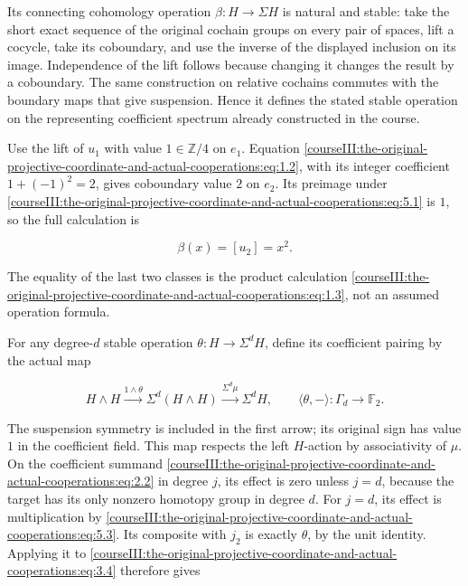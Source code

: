 Its connecting cohomology operation \(\beta:H\to\Sigma H\) is natural and stable: take the short exact sequence of the original cochain groups on every pair of spaces, lift a cocycle, take its coboundary, and use the inverse of the displayed inclusion on its image. Independence of the lift follows because changing it changes the result by a coboundary. The same construction on relative cochains commutes with the boundary maps that give suspension. Hence it defines the stated stable operation on the representing coefficient spectrum already constructed in the course.

Use the lift of \(u_1\) with value \(1\in\mathbb Z/4\) on \(e_1\). Equation \eqref{courseIII:the-original-projective-coordinate-and-actual-cooperations:eq:1.2}, with its integer coefficient \(1+(-1)^2=2\), gives coboundary value \(2\) on \(e_2\). Its preimage under \eqref{courseIII:the-original-projective-coordinate-and-actual-cooperations:eq:5.1} is \(1\), so the full calculation is

\begin{equation}
\beta(x)=[u_2]=x^2.
 \label{courseIII:the-original-projective-coordinate-and-actual-cooperations:eq:5.2}
\end{equation}

The equality of the last two classes is the product calculation \eqref{courseIII:the-original-projective-coordinate-and-actual-cooperations:eq:1.3}, not an assumed operation formula.

For any degree-\(d\) stable operation \(\theta:H\to\Sigma^dH\), define its coefficient pairing by the actual map

\begin{equation}
H\wedge H\xrightarrow{1\wedge\theta}\Sigma^d(H\wedge H)
        \xrightarrow{\Sigma^d\mu}\Sigma^dH,
 \qquad
 \langle\theta,-\rangle:\Gamma_d\longrightarrow\mathbb F_2.
 \label{courseIII:the-original-projective-coordinate-and-actual-cooperations:eq:5.3}
\end{equation}

The suspension symmetry is included in the first arrow; its original sign has value \(1\) in the coefficient field. This map respects the left \(H\)-action by associativity of \(\mu\). On the coefficient summand \eqref{courseIII:the-original-projective-coordinate-and-actual-cooperations:eq:2.2} in degree \(j\), its effect is zero unless \(j=d\), because the target has its only nonzero homotopy group in degree \(d\). For \(j=d\), its effect is multiplication by \eqref{courseIII:the-original-projective-coordinate-and-actual-cooperations:eq:5.3}. Its composite with \(j_2\) is exactly \(\theta\), by the unit identity. Applying it to \eqref{courseIII:the-original-projective-coordinate-and-actual-cooperations:eq:3.4} therefore gives

